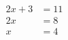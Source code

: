 \documentclass{article}
\begin{document}
\begin{align*}
2x + 3 &= 11 \\
2x &= 8 \\
x &= 4
\end{align*}
\end{document}
